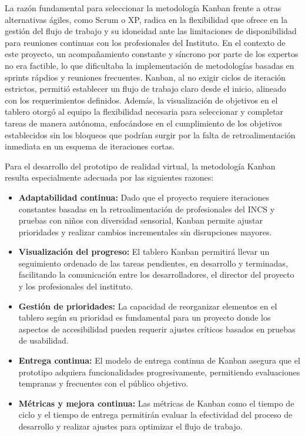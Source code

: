 La razón fundamental para seleccionar la metodología Kanban frente a otras alternativas ágiles, como Scrum o XP, radica en la flexibilidad que ofrece en la gestión del flujo de trabajo y su idoneidad ante las limitaciones de disponibilidad para reuniones continuas con los profesionales del Instituto. En el contexto de este proyecto, un acompañamiento constante y síncrono por parte de los expertos no era factible, lo que dificultaba la implementación de metodologías basadas en sprints rápdios y reuniones frecuentes. Kanban, al no exigir ciclos de iteración estrictos, permitió establecer un flujo de trabajo claro desde el inicio, alineado con los requerimientos definidos. Además, la visualización de objetivos en el tablero otorgó al equipo la flexibilidad necesaria para seleccionar y completar tareas de manera autónoma, enfocándose en el cumplimiento de los objetivos establecidos sin los bloqueos que podrían surgir por la falta de retroalimentación inmediata en un esquema de iteraciones cortas.

Para el desarrollo del prototipo de realidad virtual, la metodología Kanban resulta especialmente adecuada por las siguientes razones:

\begin{itemize}
    \item \textbf{Adaptabilidad continua:} Dado que el proyecto requiere iteraciones constantes basadas en la retroalimentación de profesionales del INCS y pruebas con niños con diversidad sensorial, Kanban permite ajustar prioridades y realizar cambios incrementales sin disrupciones mayores.
    
    \item \textbf{Visualización del progreso:} El tablero Kanban permitirá llevar un seguimiento ordenado de las tareas pendientes, en desarrollo y terminadas, facilitando la comunicación entre los desarrolladores, el director del proyecto y los profesionales del instituto.
    
    \item \textbf{Gestión de prioridades:} La capacidad de reorganizar elementos en el tablero según su prioridad es fundamental para un proyecto donde los aspectos de accesibilidad pueden requerir ajustes críticos basados en pruebas de usabilidad.
    
    \item \textbf{Entrega continua:} El modelo de entrega continua de Kanban asegura que el prototipo adquiera funcionalidades progresivamente, permitiendo evaluaciones tempranas y frecuentes con el público objetivo.
    
    \item \textbf{Métricas y mejora continua:} Las métricas de Kanban como el tiempo de ciclo y el tiempo de entrega permitirán evaluar la efectividad del proceso de desarrollo y realizar ajustes para optimizar el flujo de trabajo.
\end{itemize}

